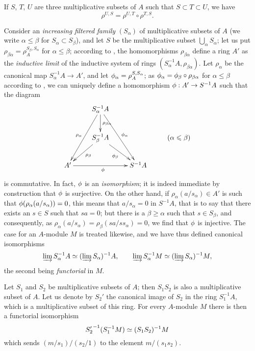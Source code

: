 \begin{env}[1.4.4]
\label{0.1.4.4}
If $S$, $T$, $U$ are three multiplicative subsets of $A$ such that
$S\subset T\subset U$, we have
\[
  \rho^{U,S}=\rho^{U,T}\circ\rho^{T,S}.
\]
\end{env}

\begin{env}[1.4.5]
\label{0.1.4.5}
Consider an \emph{increasing filtered family} $(S_\alpha)$ of multiplicative
subsets of $A$ (we write $\alpha\leqslant\beta$ for $S_\alpha\subset S_\beta$),
and let $S$ be the multiplicative subset $\bigcup_\alpha S_\alpha$; let us put
$\rho_{\beta\alpha}=\rho_A^{S_\beta,S_\alpha}$ for $\alpha\leqslant\beta$;
according to , the homomorphisms $\rho_{\beta\alpha}$ define a
ring $A'$ as the \emph{inductive limit} of the inductive system of rings
$(S_\alpha^{-1}A,\rho_{\beta\alpha})$. Let $\rho_\alpha$ be the canonical map
$S_\alpha^{-1}A\to A'$, and let $\phi_\alpha=\rho_A^{S,S_\alpha}$; as
$\phi_\alpha=\phi_\beta\circ\rho_{\beta\alpha}$ for $\alpha\leqslant\beta$
according to , we can uniquely define a homomorphism
$\vphi:A'\to S^{-1}A$ such that the diagram
\[
  \xymatrix{
    & S_\alpha^{-1}A\ar[ddl]_{\rho_\alpha}
                    \ar[d]^{\rho_{\beta\alpha}}
                    \ar[rdd]^{\vphi_\alpha}\\
    & S_\beta^{-1}A\ar[ld]^{\rho_\beta}
                   \ar[rd]_{\vphi_\beta}
    & & (\alpha\leqslant\beta)\\
    A'\ar[rr]_\vphi
    & & S^{-1}A
  }
\]
is commutative. In fact, $\phi$ is an \emph{isomorphism}; it is indeed
immediate by construction that $\phi$ is surjective. On the other hand, if
$\rho_\alpha(a/s_\alpha)\in A'$ is such that $\phi(\rho_\alpha(a/s_\alpha))=0$,
this means that $a/s_\alpha=0$ in $S^{-1}A$, that is to say that there exists an
$s\in S$ such that $sa=0$; but there is a $\beta\geqslant\alpha$ such that
$s\in S_\beta$, and consequently, as
$\rho_\alpha(a/s_\alpha)=\rho_\beta(sa/ss_\alpha)=0$, we find that $\phi$ is
injective. The case for an $A$-module $M$ is treated likewise, and we have thus
defined canonical isomorphisms
\[
  \varinjlim S_\alpha^{-1}A\simeq(\varinjlim S_\alpha)^{-1}A,\qquad
  \varinjlim S_\alpha^{-1}M\simeq(\varinjlim S_\alpha)^{-1}M,
\]
the second being \emph{functorial} in $M$.
\end{env}

\begin{env}[1.4.6]
\label{0.1.4.6}
Let $S_1$ and $S_2$ be multiplicative subsets of $A$; then $S_1 S_2$ is also a
multiplicative subset of $A$. Let us denote by $S_2'$ the canonical image of
$S_2$ in the ring $S_1^{-1}A$, which is a multiplicative subset of this ring.
For every $A$-module $M$ there is then a functorial isomorphism
\[
  {S_2'}^{-1}(S_1^{-1}M)\simeq(S_1 S_2)^{-1}M
\]
which sends $(m/s_1)/(s_2/1)$ to the element $m/(s_1 s_2)$.
\end{env}

